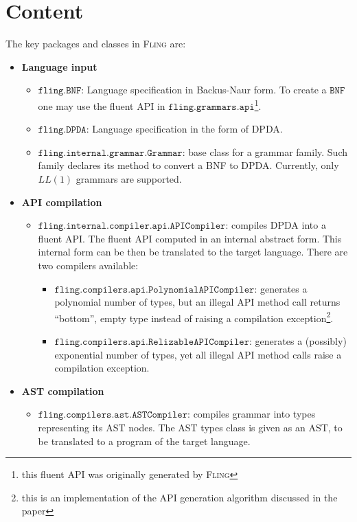 \documentclass[a4paper,UKenglish,cleveref, autoref]{darts-v2019}
\newcommand{\Fling}{F\textsc{ling}\xspace}
\DeclareRobustCommand{\tt}[1]{{\ensuremath{\texttt{#1}}}}
\newenvironment{content}{\section{Content}}{}
\begin{document}
\begin{content}
The key packages and classes in \Fling are:
\begin{itemize}
	\item \textbf{Language input}
	\begin{itemize}
		\item \tt{fling.BNF}: Language specification in Backus-Naur form.
		To create a \tt{BNF} one may use the fluent API in \tt{fling.grammars.api}\footnote{
			this fluent API was originally generated by \Fling}.
		\item \tt{fling.DPDA}: Language specification in the form of DPDA.
		\item \tt{fling.internal.grammar.Grammar}: base class for a grammar family.
		Such family declares its method to convert a BNF to DPDA. Currently, only~$LL(1)$
		grammars are supported.
	\end{itemize}
	\item \textbf{API compilation}
	\begin{itemize}
		\item \tt{fling.internal.compiler.api.APICompiler}: compiles DPDA into a fluent API.
		The fluent API computed in an internal abstract form. This internal form
    can be then be translated to the target language.
		There are two compilers available:
		\begin{itemize}
			\item \tt{fling.compilers.api.PolynomialAPICompiler}: generates a polynomial number of
			types, but an illegal API method call returns ``bottom'', empty type instead of raising
			a compilation exception\footnote{this is an implementation of the API generation algorithm
			discussed in the paper}.
			\item \tt{fling.compilers.api.RelizableAPICompiler}: generates a (possibly) exponential number of
			types, yet all illegal API method calls raise a compilation exception.
		\end{itemize}
	\end{itemize}
	\item \textbf{AST compilation}
	\begin{itemize}
		\item \tt{fling.compilers.ast.ASTCompiler}: compiles grammar into types representing its AST nodes.
		The AST types class is given as an AST, to be translated to a program of the target language.
	\end{itemize}

\end{itemize}
\end{content}
\end{document}
